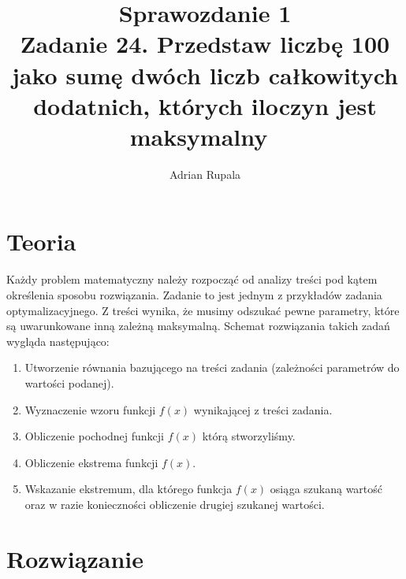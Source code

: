 \documentclass[UTF8]{article}
\title{%
	Sprawozdanie 1 \\
	\large Zadanie 24. Przedstaw liczbę 100 jako sumę dwóch liczb całkowitych dodatnich, których iloczyn jest maksymalny~}
\author{Adrian Rupala}
\begin{document}
\maketitle

\newpage
\tableofcontents

\newpage
{}

\section{Teoria}

Każdy problem matematyczny należy rozpocząć od analizy treści pod kątem określenia sposobu rozwiązania. Zadanie to jest jednym z przykładów zadania optymalizacyjnego. Z treści wynika, że musimy odszukać pewne parametry, które są uwarunkowane inną zależną maksymalną. Schemat rozwiązania takich zadań wygląda następująco: ~
\begin{enumerate}
	\item Utworzenie równania bazującego na treści zadania (zależności parametrów do wartości podanej).
	\item Wyznaczenie wzoru funkcji $f(x)$ wynikającej z treści zadania. ~
	\item Obliczenie pochodnej funkcji $f(x)$  którą stworzyliśmy. ~
	\item Obliczenie ekstrema funkcji $f(x)$. ~
	\item Wskazanie ekstremum, dla którego funkcja $f(x)$ osiąga szukaną wartość oraz w razie konieczności obliczenie drugiej szukanej wartości.~
\end{enumerate}

\section{Rozwiązanie}
\end{document}
